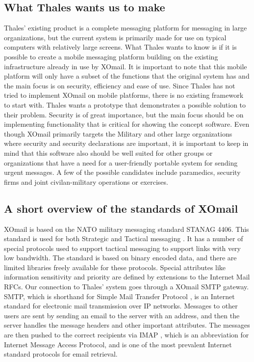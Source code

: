 \subsection*{What Thales wants us to make}
Thales’ existing product is a complete messaging platform for messaging in large organizations, but the current system is primarily made for use on typical computers with relatively large screens. What Thales wants to know is if it is possible to create a mobile messaging platform building on the existing infrastructure already in use by XOmail. It is important to note that this mobile platform will only have a subset of the functions that the original system has and the main focus is on security, efficiency and ease of use.
\newline
\newline
Since Thales has not tried to implement XOmail on mobile platforms, there is no existing framework to start with. Thales wants a prototype that demonstrates a possible solution to their problem. Security is of great importance, but the main focus should be on implementing functionality that is critical for showing the concept software.  
\newline
\newline
Even though XOmail primarily targets the Military and other large organizations where security and security declarations are important, it is important to keep in mind that this software also should be well suited for other groups or organizations that have a need for a user-friendly portable system for sending urgent messages. A few of the possible candidates include paramedics, security firms and joint civilan-military operations or exercises.

\subsection*{A short overview of the standards of XOmail}
XOmail is based on the NATO military messaging standard STANAG 4406. This standard is used for both Strategic and Tactical messaging \cite{bib:stanag}. It has a number of special protocols used to support tactical messaging to support links with very low bandwidth.
\newline
\newline
The standard is based on binary encoded data, and there are limited libraries freely available for these protocols. Special attributes like information sensitivity and priority are defined by extensions to the Internet Mail RFCs. Our connection to Thales’ system goes through a XOmail SMTP gateway. SMTP, which is shorthand for Simple Mail Transfer Protocol \cite{bib:smtp}, is an Internet standard for electronic mail transmission over IP networks. Messages to other users are sent by sending an email to the server with an address, and then the server handles the message headers and other important attributes. The messages are then pushed to the correct recipients via IMAP \cite{bib:imap}, which is an abbreviation for Internet Message Access Protocol, and is one of the most prevalent Internet standard protocols for email retrieval. 

